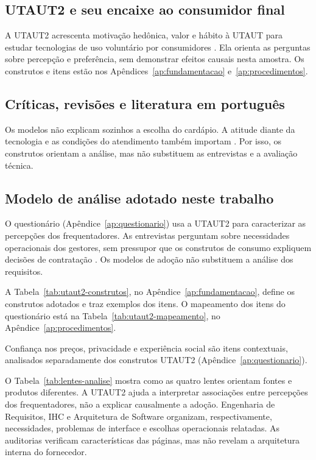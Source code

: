 \subsection{UTAUT2 e seu encaixe ao consumidor final}
\label{sec:utaut2}

A UTAUT2 acrescenta motivação hedônica, valor e hábito à UTAUT para estudar tecnologias de uso voluntário por consumidores \cite{venkatesh2012consumer}. Ela orienta as perguntas sobre percepção e preferência, sem demonstrar efeitos causais nesta amostra. Os construtos e itens estão nos Apêndices~\ref{ap:fundamentacao} e~\ref{ap:procedimentos}.

\subsection{Críticas, revisões e literatura em português}
\label{sec:adocao-criticas}

Os modelos não explicam sozinhos a escolha do cardápio. A atitude diante da tecnologia e as condições do atendimento também importam \cite{bagozzi2007legacy,dwivedi2019reexamining,brito2019limitacoes,batista2023consideracoes}. Por isso, os construtos orientam a análise, mas não substituem as entrevistas e a avaliação técnica.

\subsection{Modelo de análise adotado neste trabalho}
\label{sec:modelo-adotado}

O questionário (Apêndice~\ref{ap:questionario}) usa a UTAUT2 para caracterizar as percepções dos frequentadores. As entrevistas perguntam sobre necessidades operacionais dos gestores, sem pressupor que os construtos de consumo expliquem decisões de contratação \cite{venkatesh2003useracceptance}. Os modelos de adoção não substituem a análise dos requisitos.

A Tabela~\ref{tab:utaut2-construtos}, no Apêndice~\ref{ap:fundamentacao}, define os construtos adotados e traz exemplos dos itens. O mapeamento dos itens do questionário está na Tabela~\ref{tab:utaut2-mapeamento}, no Apêndice~\ref{ap:procedimentos}.

Confiança nos preços, privacidade e experiência social são itens contextuais, analisados separadamente dos construtos UTAUT2 (Apêndice~\ref{ap:questionario}).

O Tabela~\ref{tab:lentes-analise} mostra como as quatro lentes orientam fontes e produtos diferentes. A UTAUT2 ajuda a interpretar associações entre percepções dos frequentadores, não a explicar causalmente a adoção. Engenharia de Requisitos, IHC e Arquitetura de Software organizam, respectivamente, necessidades, problemas de interface e escolhas operacionais relatadas. As auditorias verificam características das páginas, mas não revelam a arquitetura interna do fornecedor.

